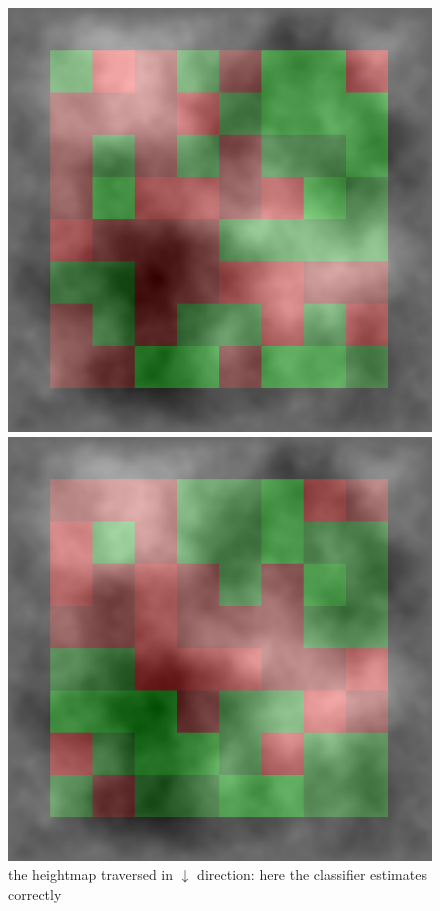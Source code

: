 \documentclass[]{usiinfbachelorproject}
\begin{document}
\begin{figure}[H]
  \includegraphics[width=\linewidth]{heatmap90}
    \caption{the heightmap traversed in $\downarrow$ direction: here the classifier estimates correctly }\label{fig:heatmap90}
\endminipage\hfill
{}
  \includegraphics[width=\linewidth]{heatmap135}

\end{figure}
\end{document}
